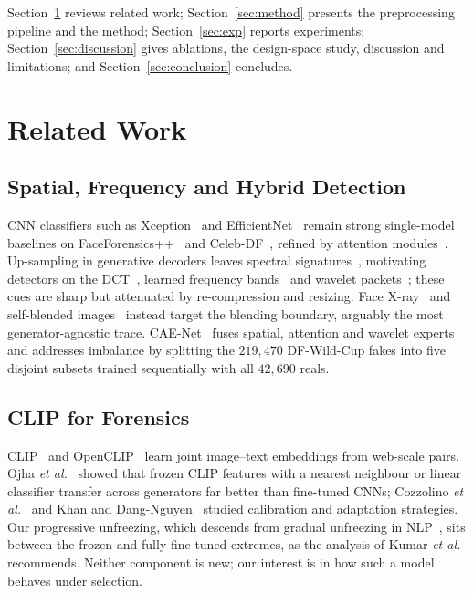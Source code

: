 \documentclass[10pt,journal]{IEEEtran}
\begin{document}
Section~\ref{sec:related} reviews related work; Section~\ref{sec:method}
presents the preprocessing pipeline and the method;
Section~\ref{sec:exp} reports experiments; Section~\ref{sec:discussion}
gives ablations, the design-space study, discussion and limitations; and
Section~\ref{sec:conclusion} concludes.

\section{Related Work}\label{sec:related}

\subsection{Spatial, Frequency and Hybrid Detection}
CNN classifiers such as Xception~\cite{chollet2017xception} and
EfficientNet~\cite{tan2019efficientnet} remain strong single-model baselines on
FaceForensics++~\cite{rossler2019faceforensics} and
Celeb-DF~\cite{li2020celebdf}, refined by attention
modules~\cite{hu2018senet,woo2018cbam,zhao2021multiattentional}.
Up-sampling in generative decoders leaves spectral
signatures~\cite{durall2020upconvolution}, motivating detectors on the
DCT~\cite{frank2020frequency,ricker2024dct}, learned frequency
bands~\cite{qian2020f3net} and wavelet packets~\cite{wolter2022waveletpacket};
these cues are sharp but attenuated by re-compression and resizing. Face
X-ray~\cite{li2020facexray} and self-blended images~\cite{shiohara2022sbi}
instead target the blending boundary, arguably the most generator-agnostic
trace. CAE-Net~\cite{bhattacharjee2026caenet} fuses spatial, attention and
wavelet experts and addresses imbalance by splitting the $219{,}470$ DF-Wild-Cup
fakes into five disjoint subsets trained sequentially with all $42{,}690$ reals.

\subsection{CLIP for Forensics}
CLIP~\cite{radford2021clip} and OpenCLIP~\cite{ilharco2021openclip,cherti2023openclip}
learn joint image--text embeddings from web-scale pairs. Ojha \emph{et
al.}~\cite{ojha2023universal} showed that frozen CLIP features with a nearest
neighbour or linear classifier transfer across generators far better than
fine-tuned CNNs; Cozzolino \emph{et al.}~\cite{cozzolino2024raising} and Khan
and Dang-Nguyen~\cite{khan2024clipping} studied calibration and adaptation
strategies. Our progressive unfreezing, which descends from gradual unfreezing
in NLP~\cite{howard2018ulmfit}, sits between the frozen and fully fine-tuned
extremes, as the analysis of Kumar \emph{et al.}~\cite{kumar2022finetuning}
recommends. Neither component is new; our interest is in how such a model
behaves under selection.
\end{document}
